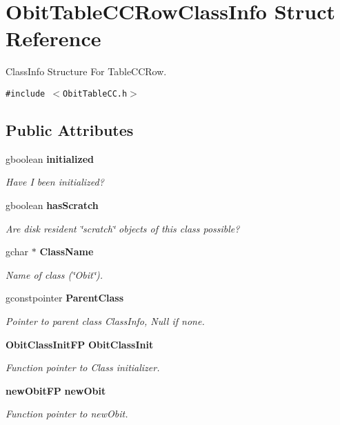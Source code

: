 \section{Obit\-Table\-CCRow\-Class\-Info Struct Reference}
\label{structObitTableCCRowClassInfo}
Class\-Info Structure For Table\-CCRow.  


{\tt \#include $<$Obit\-Table\-CC.h$>$}

\subsection*{Public Attributes}
\begin{CompactItemize}
\item 
gboolean {\bf initialized}
\begin{CompactList}\small\item\em Have I been initialized? \item\end{CompactList}\item 
gboolean {\bf has\-Scratch}
\begin{CompactList}\small\item\em Are disk resident \char`\"{}scratch\char`\"{} objects of this class possible? \item\end{CompactList}\item 
gchar $\ast$ {\bf Class\-Name}
\begin{CompactList}\small\item\em Name of class (\char`\"{}Obit\char`\"{}). \item\end{CompactList}\item 
gconstpointer {\bf Parent\-Class}
\begin{CompactList}\small\item\em Pointer to parent class Class\-Info, Null if none. \item\end{CompactList}\item 
{\bf Obit\-Class\-Init\-FP} {\bf Obit\-Class\-Init}
\begin{CompactList}\small\item\em Function pointer to Class initializer. \item\end{CompactList}\item 
{\bf new\-Obit\-FP} {\bf new\-Obit}
\begin{CompactList}\small\item\em Function pointer to new\-Obit. \item\end{CompactList}\item 

\end{CompactItemize}
